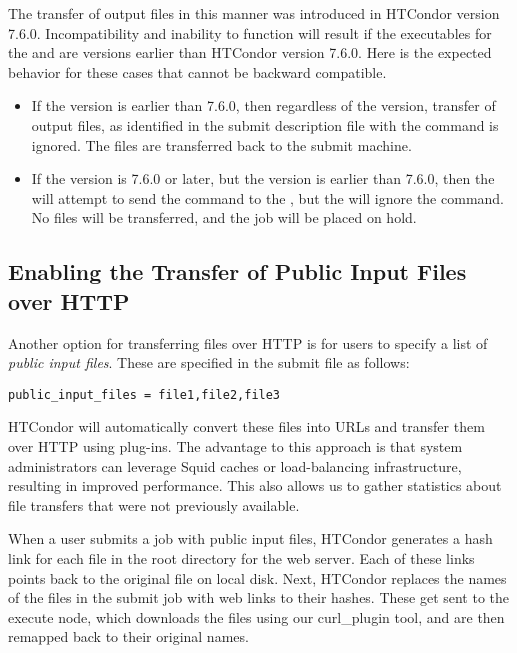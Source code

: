 The transfer of output files in this manner was introduced 
in HTCondor version 7.6.0. 
Incompatibility and inability to function will result if the executables
for the  and  are versions earlier
than HTCondor version 7.6.0.
Here is the expected behavior for these cases that 
cannot be backward compatible. 
\begin{itemize}
\item
If the  version is earlier than 7.6.0,
then regardless of the  version,
transfer of output files, as identified in the submit description
file with the command  is ignored.
The files are transferred back to the submit machine.
\item
If the  version is 7.6.0 or later,
but the   version is earlier than 7.6.0,
then the  will attempt to send the command to the
, but the  will ignore the command.
No files will be transferred, and the job will be placed on hold.
\end{itemize}

\subsection{\label{sec:HTTP-Public-File-Transfer}
Enabling the Transfer of Public Input Files over HTTP}

Another option for transferring files over HTTP is for users to specify
a list of \emph{public input files}. These are specified in the submit
file as follows:
\footnotesize
\begin{verbatim}
public_input_files = file1,file2,file3
\end{verbatim}
\normalsize

HTCondor will automatically convert these files into URLs and transfer them 
over HTTP using plug-ins. The advantage to this approach is that system 
administrators can leverage Squid caches or load-balancing infrastructure, 
resulting in improved performance. This also allows us to gather statistics 
about file transfers that were not previously available.

When a user submits a job with public input files, HTCondor generates a 
hash link for each file in the root directory for the web server. Each 
of these links points back to the original file on local disk. Next, 
HTCondor replaces the names of the files in the submit job with web links
to their hashes. These get sent to the execute node, which downloads the 
files using our curl\_plugin tool, and are then remapped back to their
original names.

